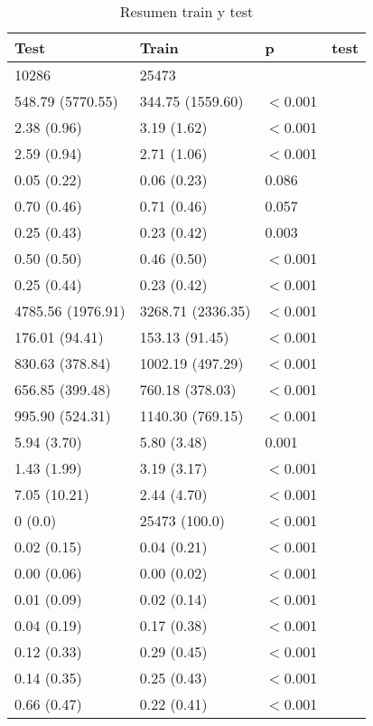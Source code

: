 \begin{table}[ht]
\centering
\begin{tabular}{llll}
  \hline
Test & Train & p & test \\ 
  \hline
  10286 &   25473 &  &  \\ 
   548.79 (5770.55) &  344.75 (1559.60) & $<$0.001 &  \\ 
     2.38 (0.96) &    3.19 (1.62) & $<$0.001 &  \\ 
     2.59 (0.94) &    2.71 (1.06) & $<$0.001 &  \\ 
     0.05 (0.22) &    0.06 (0.23) &  0.086 &  \\ 
     0.70 (0.46) &    0.71 (0.46) &  0.057 &  \\ 
     0.25 (0.43) &    0.23 (0.42) &  0.003 &  \\ 
     0.50 (0.50) &    0.46 (0.50) & $<$0.001 &  \\ 
     0.25 (0.44) &    0.23 (0.42) & $<$0.001 &  \\ 
  4785.56 (1976.91) & 3268.71 (2336.35) & $<$0.001 &  \\ 
   176.01 (94.41) &  153.13 (91.45) & $<$0.001 &  \\ 
   830.63 (378.84) & 1002.19 (497.29) & $<$0.001 &  \\ 
   656.85 (399.48) &  760.18 (378.03) & $<$0.001 &  \\ 
   995.90 (524.31) & 1140.30 (769.15) & $<$0.001 &  \\ 
     5.94 (3.70) &    5.80 (3.48) &  0.001 &  \\ 
     1.43 (1.99) &    3.19 (3.17) & $<$0.001 &  \\ 
     7.05 (10.21) &    2.44 (4.70) & $<$0.001 &  \\ 
        0 (0.0)  &   25473 (100.0)  & $<$0.001 &  \\ 
     0.02 (0.15) &    0.04 (0.21) & $<$0.001 &  \\ 
     0.00 (0.06) &    0.00 (0.02) & $<$0.001 &  \\ 
     0.01 (0.09) &    0.02 (0.14) & $<$0.001 &  \\ 
     0.04 (0.19) &    0.17 (0.38) & $<$0.001 &  \\ 
     0.12 (0.33) &    0.29 (0.45) & $<$0.001 &  \\ 
     0.14 (0.35) &    0.25 (0.43) & $<$0.001 &  \\ 
     0.66 (0.47) &    0.22 (0.41) & $<$0.001 &  \\ 
   \hline
\end{tabular}
\caption{Resumen train y test} 
\end{table}
